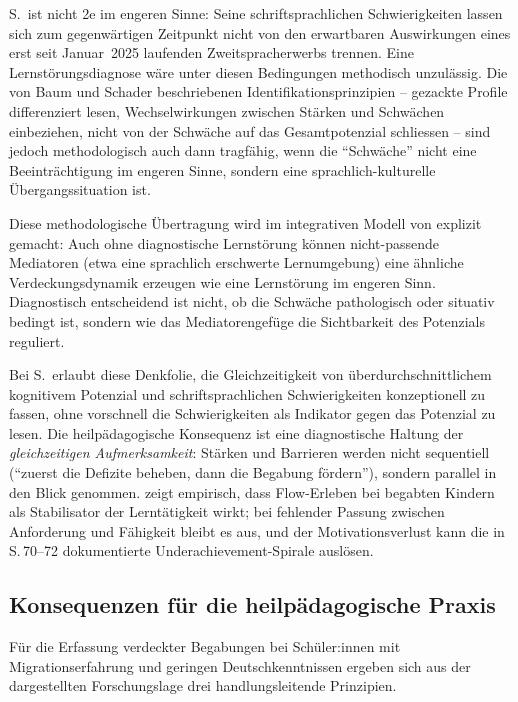 \documentclass[ngerman, a4paper]{article}
\begin{document}
S.\ ist nicht 2e im engeren Sinne: Seine schriftsprachlichen
Schwierigkeiten lassen sich zum gegenwärtigen Zeitpunkt nicht von den
erwartbaren Auswirkungen eines erst seit Januar~2025 laufenden
Zweitspracherwerbs trennen. Eine Lernstörungsdiagnose wäre unter diesen
Bedingungen methodisch unzulässig. Die von Baum und Schader beschriebenen
Identifikationsprinzipien -- gezackte Profile differenziert lesen,
Wechselwirkungen zwischen Stärken und Schwächen einbeziehen, nicht von der
Schwäche auf das Gesamtpotenzial schliessen -- sind jedoch methodologisch
auch dann tragfähig, wenn die \enquote{Schwäche} nicht eine
Beeinträchtigung im engeren Sinne, sondern eine sprachlich-kulturelle
Übergangssituation ist.

Diese methodologische Übertragung wird im integrativen Modell von
\textcite[S.\,396--398]{fischerfischerontrup2014integratives} explizit gemacht:
Auch ohne diagnostische Lernstörung können nicht-passende Mediatoren (etwa eine
sprachlich erschwerte Lernumgebung) eine ähnliche Verdeckungsdynamik erzeugen wie
eine Lernstörung im engeren Sinn. Diagnostisch entscheidend ist nicht, ob die
Schwäche pathologisch oder situativ bedingt ist, sondern wie das Mediatorengefüge
die Sichtbarkeit des Potenzials reguliert.

Bei S.\ erlaubt diese Denkfolie, die Gleichzeitigkeit von
überdurchschnittlichem kognitivem Potenzial und schriftsprachlichen
Schwierigkeiten konzeptionell zu fassen, ohne vorschnell die Schwierigkeiten
als Indikator gegen das Potenzial zu lesen. Die heilpädagogische Konsequenz
ist eine diagnostische Haltung der \textit{gleichzeitigen Aufmerksamkeit}:
Stärken und Barrieren werden nicht sequentiell (\enquote{zuerst die Defizite
beheben, dann die Begabung fördern}), sondern parallel in den Blick
genommen. \textcite[S.\,84--89]{lehwald2017motivation} zeigt empirisch,
dass Flow-Erleben bei begabten Kindern als Stabilisator der Lerntätigkeit
wirkt; bei fehlender Passung zwischen Anforderung und Fähigkeit bleibt es
aus, und der Motivationsverlust kann die in
S.\,70--72 dokumentierte Underachievement-Spirale auslösen.

\subsection{Konsequenzen für die heilpädagogische Praxis}

Für die Erfassung verdeckter Begabungen bei Schüler:innen mit Migrationserfahrung und
geringen Deutschkenntnissen ergeben sich aus der dargestellten Forschungslage drei
handlungsleitende Prinzipien.
\end{document}
